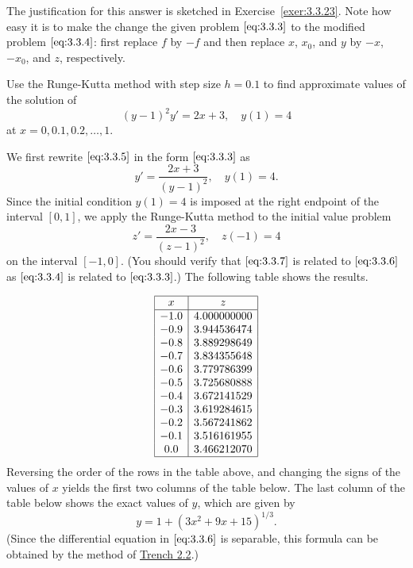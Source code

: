 \documentclass{ximera}
\begin{document}
The justification for this answer is sketched in
Exercise~\ref{exer:3.3.23}. Note how easy it is to make the change
the given problem $\eqref{eq:3.3.3}$ to the modified problem
$\eqref{eq:3.3.4}$: first replace $f$ by $-f$ and then replace $x$,
$x_0$, and $y$ by $-x$, $-x_0$, and $z$, respectively.


\begin{example}\label{example:3.3.5}
Use the Runge-Kutta  method with step size $h=0.1$
 to find approximate values of the solution of
\begin{equation} \label{eq:3.3.5}
(y-1)^2y'=2x+3,\quad y(1)=4
\end{equation}
at $x=0, 0.1, 0.2, \dots, 1$.


\begin{explanation} 
We first rewrite $\eqref{eq:3.3.5}$ in the form $\eqref{eq:3.3.3}$
as
\begin{equation} \label{eq:3.3.6}
y'=\frac{2x+3}{(y-1)^2},\quad y(1)=4.
\end{equation}
Since the initial condition $y(1)=4$  is imposed at the right endpoint
of the interval $[0,1]$, we apply the Runge-Kutta method to the
initial value problem
\begin{equation} \label{eq:3.3.7}
z'=\frac{2x-3}{(z-1)^2},\quad z(-1)=4
\end{equation}
on the interval $[-1,0]$.
(You should verify that $\eqref{eq:3.3.7}$ is related to $\eqref{eq:3.3.6}$ as
$\eqref{eq:3.3.4}$ is related to $\eqref{eq:3.3.3}$.)
 The following table shows the results.  
 
$$
\begin{array}{|c|c|}
\hline
x&
z\\ \hline
-1.0 & 4.000000000  \\
-0.9 & 3.944536474  \\
-0.8 & 3.889298649  \\
-0.7 & 3.834355648  \\
-0.6 & 3.779786399  \\
-0.5 & 3.725680888  \\
-0.4 & 3.672141529  \\
-0.3 & 3.619284615  \\
-0.2 & 3.567241862  \\
-0.1 & 3.516161955  \\
 0.0 & 3.466212070 \\
\hline
\end{array}
$$
 Reversing the
order of the
rows in the table above, and changing the signs of the values of $x$
yields the first two columns of the table below.   The last
column of the table below shows the exact values of $y$, which
are given by
$$
y=1+(3x^2+9x+15)^{1/3}.
$$
(Since the differential equation in $\eqref{eq:3.3.6}$ is separable,
this formula can be obtained by the method of \href{https://ximera.osu.edu/ode/main/separableEquations/separableEquations}{Trench 2.2}.)



\end{explanation}
\end{example}
\end{document}
